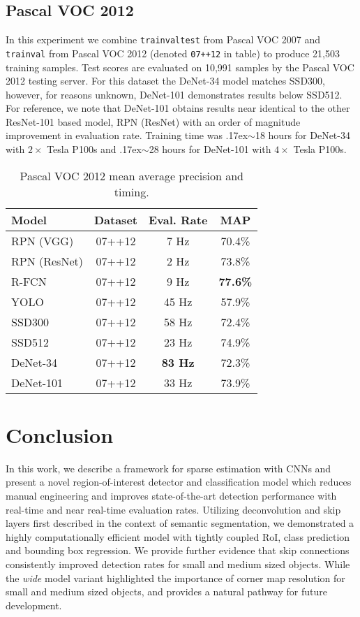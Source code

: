 \documentclass[10pt,twocolumn]{article}
\newcommand\approxtilde{\raise.17ex\hbox{$\scriptstyle\sim$}}
\begin{document}
\subsection{Pascal VOC 2012}
In this experiment we combine \texttt{trainvaltest} from Pascal VOC 2007 and \texttt{trainval} from Pascal VOC 2012 \cite{pascal-voc} (denoted \texttt{07++12} in table) to produce 21,503 training samples. Test scores are evaluated on 10,991 samples by the Pascal VOC 2012 testing server. For this dataset the DeNet-34 model matches SSD300, however, for reasons unknown, DeNet-101 demonstrates results below SSD512. For reference, we note that DeNet-101 obtains results near identical to the other ResNet-101 based model, RPN (ResNet) with an order of magnitude improvement in evaluation rate. Training time was \approxtilde 18 hours for DeNet-34 with $2\times$ Tesla P100s and \approxtilde 28 hours for DeNet-101  with $4\times$ Tesla P100s.

\begin{table}[tb]
\begin{center}
\begin{tabular}{l|c|c|c}
 Model & Dataset & Eval. Rate & MAP \\
\hline
\rowcolor[gray]{.85} RPN (VGG) & 07++12 & 7 Hz & 70.4\% \\
\rowcolor[gray]{.85} RPN (ResNet) & 07++12  & 2 Hz &  73.8\%\\
\rowcolor[gray]{.85} R-FCN & 07++12 & 9 Hz & \textbf{77.6\%} \\
YOLO & 07++12  & 45 Hz & 57.9\% \\
SSD300 & 07++12  & 58 Hz & 72.4\% \\
SSD512 & 07++12  & 23 Hz & 74.9\% \\
\hline
DeNet-34 & 07++12 &  \textbf{83 Hz} & 72.3\% \\
DeNet-101 & 07++12 & 33 Hz & 73.9\% 
\end{tabular}
\end{center}
\caption{Pascal VOC 2012 mean average precision and timing. }
\label{table:voc2012}
\end{table}

\section{Conclusion}
In this work, we describe a framework for sparse estimation with CNNs and present a novel region-of-interest detector and classification model which reduces manual engineering and improves state-of-the-art detection performance with real-time and near real-time evaluation rates. Utilizing deconvolution and skip layers first described in the context of semantic segmentation, we demonstrated a highly computationally efficient model with tightly coupled RoI, class prediction and bounding box regression. We provide further evidence that skip connections consistently improved detection rates for small and medium sized objects. While the \textit{wide} model variant highlighted the importance of corner map resolution for small and medium sized objects, and provides a natural pathway for future development. 
\end{document}
